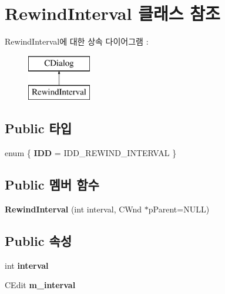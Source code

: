\hypertarget{class_rewind_interval}{}\section{Rewind\+Interval 클래스 참조}
\label{class_rewind_interval}
Rewind\+Interval에 대한 상속 다이어그램 \+: \begin{figure}[H]
\begin{center}
\leavevmode
\includegraphics[height=2.000000cm]{class_rewind_interval}
\end{center}
\end{figure}
\subsection*{Public 타입}
\begin{DoxyCompactItemize}
\item 
\mbox{\label{class_rewind_interval_aea74dcd9cfdb01eab907a1e6a633786f}} 
enum \{ {\bfseries I\+DD} = I\+D\+D\+\_\+\+R\+E\+W\+I\+N\+D\+\_\+\+I\+N\+T\+E\+R\+V\+AL
 \}
\end{DoxyCompactItemize}
\subsection*{Public 멤버 함수}
\begin{DoxyCompactItemize}
\item 
\mbox{\label{class_rewind_interval_abf63f08752f596ac0fa23b5cc75705ef}} 
{\bfseries Rewind\+Interval} (int interval, C\+Wnd $\ast$p\+Parent=N\+U\+LL)
\end{DoxyCompactItemize}
\subsection*{Public 속성}
\begin{DoxyCompactItemize}
\item 
\mbox{\label{class_rewind_interval_a3bf155d8d02f9b48cfb2c521fbd05c10}} 
int {\bfseries interval}
\item 
\mbox{\label{class_rewind_interval_a67355ee1278bb5827beca804a2e2fcb5}} 
C\+Edit {\bfseries m\+\_\+interval}
\end{DoxyCompactItemize}
